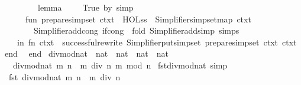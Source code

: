 \begin{isabellebody}
\ \ \ \ \ \ \ \ {\isacharat}{\kern0pt}\ {\isacharbrackleft}{\kern0pt}{\isacharat}{\kern0pt}{\isacharbraceleft}{\kern0pt}lemma\ {\isachardoublequote}{\kern0pt}{}\ {\isacharequal}{\kern0pt}\ {}\ {\isasymlongleftrightarrow}\ True{\isachardoublequote}{\kern0pt}\ by\ simp{\isacharbraceright}{\kern0pt}{\isacharbrackright}{\kern0pt}{\isacharparenright}{\kern0pt}{\isacharsemicolon}{\kern0pt}\isanewline
\ \ \ \ \ \ fun\ prepare{\isacharunderscore}{\kern0pt}simpset\ ctxt\ {\isacharequal}{\kern0pt}\ HOL{\isacharunderscore}{\kern0pt}ss\ {\isacharbar}{\kern0pt}{\isachargreater}{\kern0pt}\ Simplifier{\isachardot}{\kern0pt}simpset{\isacharunderscore}{\kern0pt}map\ ctxt\isanewline
\ \ \ \ \ \ \ \ {\isacharparenleft}{\kern0pt}Simplifier{\isachardot}{\kern0pt}add{\isacharunderscore}{\kern0pt}cong\ if{\isacharunderscore}{\kern0pt}cong\ {\isacharhash}{\kern0pt}{\isachargreater}{\kern0pt}\ fold\ Simplifier{\isachardot}{\kern0pt}add{\isacharunderscore}{\kern0pt}simp\ simps{\isacharparenright}{\kern0pt}\isanewline
\ \ \ \ in\ fn\ ctxt\ {\isacharequal}{\kern0pt}{\isachargreater}{\kern0pt}\ successful{\isacharunderscore}{\kern0pt}rewrite\ {\isacharparenleft}{\kern0pt}Simplifier{\isachardot}{\kern0pt}put{\isacharunderscore}{\kern0pt}simpset\ {\isacharparenleft}{\kern0pt}prepare{\isacharunderscore}{\kern0pt}simpset\ ctxt{\isacharparenright}{\kern0pt}\ ctxt{\isacharparenright}{\kern0pt}\ end\isanewline
\ \ end\isanewline
{\isacartoucheclose}%
\endisatagML
{\isafoldML}%
%
\isadelimML
%
\endisadelimML
%
\isadelimdocument
%
\endisadelimdocument
%
\isatagdocument
%
\isamarkuptrue%
%
\endisatagdocument
{\isafolddocument}%
%
\isadelimdocument
%
\endisadelimdocument
{}\isamarkupfalse%
\ divmod{\isacharunderscore}{\kern0pt}nat\ {\isacharcolon}{\kern0pt}{\isacharcolon}{\kern0pt}\ {\isachardoublequoteopen}nat\ {\isasymRightarrow}\ nat\ {\isasymRightarrow}\ nat\ {\isasymtimes}\ nat{\isachardoublequoteclose}\isanewline
\ \ \ {\isachardoublequoteopen}divmod{\isacharunderscore}{\kern0pt}nat\ m\ n\ {\isacharequal}{\kern0pt}\ {\isacharparenleft}{\kern0pt}m\ div\ n{\isacharcomma}{\kern0pt}\ m\ mod\ n{\isacharparenright}{\kern0pt}{\isachardoublequoteclose}\isanewline
\isanewline
{}\isamarkupfalse%
\ fst{\isacharunderscore}{\kern0pt}divmod{\isacharunderscore}{\kern0pt}nat\ {\isacharbrackleft}{\kern0pt}simp{\isacharbrackright}{\kern0pt}{\isacharcolon}{\kern0pt}\isanewline
\ \ {\isachardoublequoteopen}fst\ {\isacharparenleft}{\kern0pt}divmod{\isacharunderscore}{\kern0pt}nat\ m\ n{\isacharparenright}{\kern0pt}\ {\isacharequal}{\kern0pt}\ m\ div\ n{\isachardoublequoteclose}\isanewline

\end{isabellebody}
